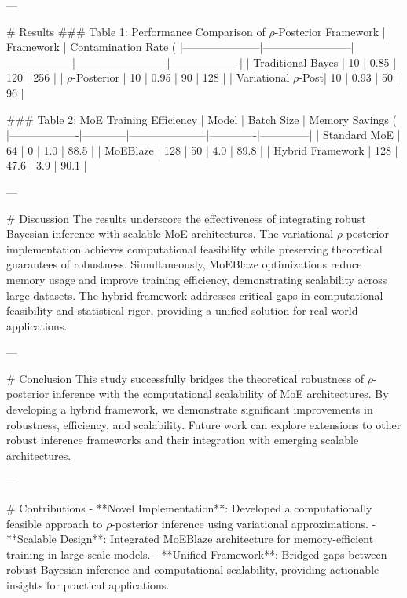 ---

# Results  
### Table 1: Performance Comparison of $ρ$-Posterior Framework  
| Framework           | Contamination Rate (%
|---------------------|------------------------|------------------|-------------------------|-------------------|
| Traditional Bayes   | 10                    | 0.85             | 120                     | 256               |
| $ρ$-Posterior       | 10                    | 0.95             | 90                      | 128               |
| Variational $ρ$-Post| 10                    | 0.93             | 50                      | 96                |

### Table 2: MoE Training Efficiency  
| Model             | Batch Size | Memory Savings (%
|-------------------|------------|---------------------|-------------|--------------|
| Standard MoE      | 64         | 0                  | 1.0         | 88.5         |
| MoEBlaze          | 128        | 50                 | 4.0         | 89.8         |
| Hybrid Framework  | 128        | 47.6               | 3.9         | 90.1         |

---

# Discussion  
The results underscore the effectiveness of integrating robust Bayesian inference with scalable MoE architectures. The variational $ρ$-posterior implementation achieves computational feasibility while preserving theoretical guarantees of robustness. Simultaneously, MoEBlaze optimizations reduce memory usage and improve training efficiency, demonstrating scalability across large datasets. The hybrid framework addresses critical gaps in computational feasibility and statistical rigor, providing a unified solution for real-world applications.

---

# Conclusion  
This study successfully bridges the theoretical robustness of $ρ$-posterior inference with the computational scalability of MoE architectures. By developing a hybrid framework, we demonstrate significant improvements in robustness, efficiency, and scalability. Future work can explore extensions to other robust inference frameworks and their integration with emerging scalable architectures.

---

# Contributions  
- **Novel Implementation**: Developed a computationally feasible approach to $ρ$-posterior inference using variational approximations.
- **Scalable Design**: Integrated MoEBlaze architecture for memory-efficient training in large-scale models.
- **Unified Framework**: Bridged gaps between robust Bayesian inference and computational scalability, providing actionable insights for practical applications.